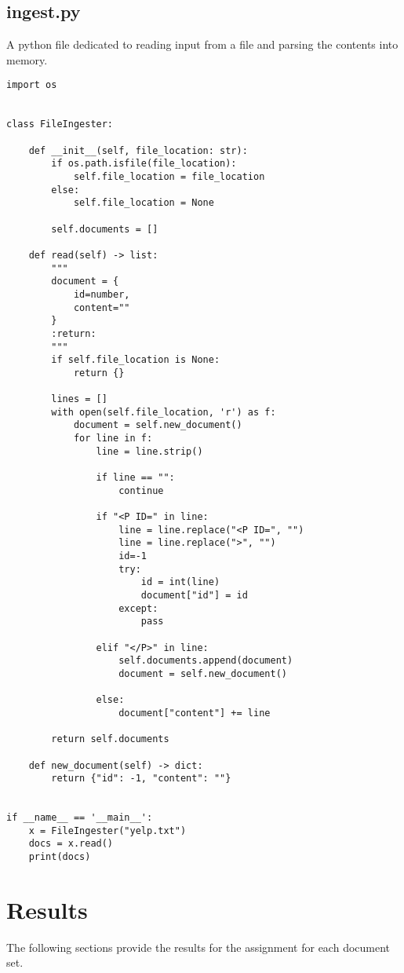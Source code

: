 \documentclass{article}
\begin{document}
\subsection{ingest.py}
A python file dedicated to reading input from a file and parsing the contents into memory.
\begin{verbatim}
import os


class FileIngester:

    def __init__(self, file_location: str):
        if os.path.isfile(file_location):
            self.file_location = file_location
        else:
            self.file_location = None

        self.documents = []

    def read(self) -> list:
        """
        document = {
            id=number,
            content=""
        }
        :return:
        """
        if self.file_location is None:
            return {}

        lines = []
        with open(self.file_location, 'r') as f:
            document = self.new_document()
            for line in f:
                line = line.strip()

                if line == "":
                    continue

                if "<P ID=" in line:
                    line = line.replace("<P ID=", "")
                    line = line.replace(">", "")
                    id=-1
                    try:
                        id = int(line)
                        document["id"] = id
                    except:
                        pass

                elif "</P>" in line:
                    self.documents.append(document)
                    document = self.new_document()

                else:
                    document["content"] += line

        return self.documents

    def new_document(self) -> dict:
        return {"id": -1, "content": ""}


if __name__ == '__main__':
    x = FileIngester("yelp.txt")
    docs = x.read()
    print(docs)
\end{verbatim}

\section{Results}
The following sections provide the results for the assignment for each document set. 
\end{document}
